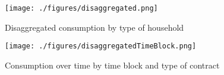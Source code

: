 \begin{figure}[ht]
  \caption{Disaggregated consumption by type of household}\label{fig:seventeen}
  \begin{center}
  {\texttt{[image: ./figures/disaggregated.png]}}
  \end{center}
\end{figure}

\FloatBarrier

\begin{figure}[ht]
  \caption{Consumption over time by time block and type of contract}\label{fig:eightteen}
  \begin{center}
  {\texttt{[image: ./figures/disaggregatedTimeBlock.png]}}
  \end{center}
\end{figure}

\FloatBarrier

\clearpage
